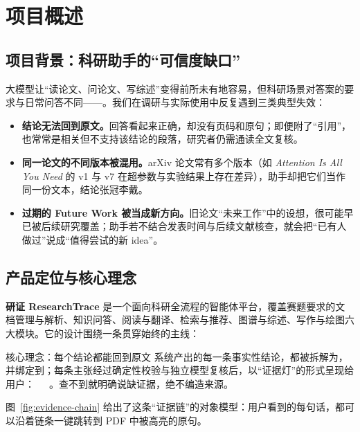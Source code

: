 \section{项目概述}

\subsection{项目背景：科研助手的“可信度缺口”}

大模型让“读论文、问论文、写综述”变得前所未有地容易，但科研场景对答案的要求与日常问答不同——。我们在调研与实际使用中反复遇到三类典型失效：

\begin{itemize}
  \item \textbf{结论无法回到原文。}回答看起来正确，却没有页码和原句；即便附了“引用”，也常常是相关但不支持该结论的段落，研究者仍需通读全文复核。
  \item \textbf{同一论文的不同版本被混用。}arXiv 论文常有多个版本（如 \emph{Attention Is All You Need} 的 v1 与 v7 在超参数与实验结果上存在差异），助手却把它们当作同一份文本，结论张冠李戴。
  \item \textbf{过期的 Future Work 被当成新方向。}旧论文“未来工作”中的设想，很可能早已被后续研究覆盖；助手若不结合发表时间与后续文献核查，就会把“已有人做过”说成“值得尝试的新 idea”。
\end{itemize}

\subsection{产品定位与核心理念}

\textbf{研证 ResearchTrace} 是一个面向科研全流程的智能体平台，覆盖赛题要求的文档管理与解析、知识问答、阅读与翻译、检索与推荐、图谱与综述、写作与绘图六大模块。它的设计围绕一条贯穿始终的主线：

\begin{keybox}{核心理念：每个结论都能回到原文}
系统产出的每一条事实性结论，都被拆解为，并绑定到；每条主张经过确定性校验与独立模型复核后，以“证据灯”的形式呈现给用户：\ \ \ 。查不到就明确说缺证据，绝不编造来源。
\end{keybox}

图~\ref{fig:evidence-chain} 给出了这条“证据链”的对象模型：用户看到的每句话，都可以沿着链条一键跳转到 PDF 中被高亮的原句。


